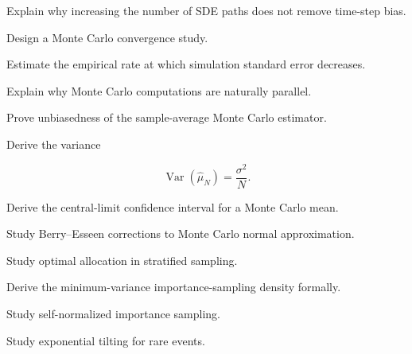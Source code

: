 \begin{exercise}[3]
Explain why increasing the number of SDE paths does not remove time-step
bias.
\end{exercise}

\begin{exercise}[3]
Design a Monte Carlo convergence study.
\end{exercise}

\begin{exercise}[3]
Estimate the empirical rate at which simulation standard error decreases.
\end{exercise}

\begin{exercise}[3]
Explain why Monte Carlo computations are naturally parallel.
\end{exercise}

\begin{exercise}[4]
Prove unbiasedness of the sample-average Monte Carlo estimator.
\end{exercise}

\begin{exercise}[4]
Derive the variance

\[
\operatorname{Var}
(
\widehat{\mu}_N
)
=
\frac{\sigma^2}{N}.
\]
\end{exercise}

\begin{exercise}[4]
Derive the central-limit confidence interval for a Monte Carlo mean.
\end{exercise}

\begin{exercise}[4]
Study Berry--Esseen corrections to Monte Carlo normal approximation.
\end{exercise}

\begin{exercise}[4]
Study optimal allocation in stratified sampling.
\end{exercise}

\begin{exercise}[4]
Derive the minimum-variance importance-sampling density formally.
\end{exercise}

\begin{exercise}[4]
Study self-normalized importance sampling.
\end{exercise}

\begin{exercise}[4]
Study exponential tilting for rare events.
\end{exercise}

